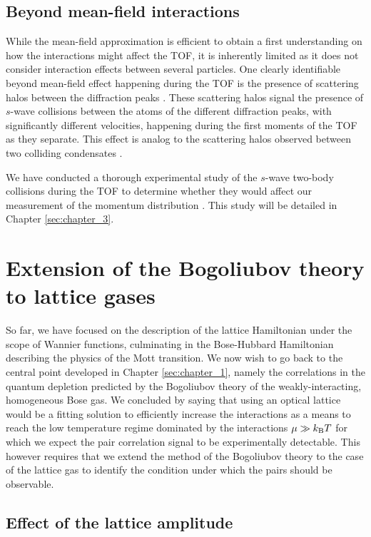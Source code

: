 \subsection{Beyond mean-field interactions}

While the mean-field approximation is efficient to obtain a first understanding on how the interactions might affect the TOF, it is inherently limited as it does not consider interaction effects between several particles. One clearly identifiable beyond mean-field effect happening during the TOF is the presence of scattering halos between the diffraction peaks \cite{greiner2001exploring}. These scattering halos signal the presence of $s$-wave collisions between the atoms of the different diffraction peaks, \ie with significantly different velocities, happening during the first moments of the TOF as they separate. This effect is analog to the scattering halos observed between two colliding condensates \cite{khakimov2016ghost,perrin2007observation,zin2006elastic}.

We have conducted a thorough experimental study of the $s$-wave two-body collisions during the TOF to determine whether they would affect our measurement of the momentum distribution \cite{tenart2020two}. This study will be detailed in Chapter \ref{sec:chapter_3}.

\section{Extension of the Bogoliubov theory to lattice gases}

So far, we have focused on the description of the lattice Hamiltonian under the scope of Wannier functions, culminating in the Bose-Hubbard Hamiltonian describing the physics of the Mott transition. We now wish to go back to the central point developed in Chapter \ref{sec:chapter_1}, namely the \kmk correlations in the quantum depletion predicted by the Bogoliubov theory of the weakly-interacting, homogeneous Bose gas. We concluded by saying that using an optical lattice would be a fitting solution to efficiently increase the interactions as a means to reach the low temperature regime dominated by the interactions $\mu \gg k_{\mathrm{B}} T$ for which we expect the pair correlation signal to be experimentally detectable. This however requires that we extend the method of the Bogoliubov theory to the case of the lattice gas to identify the condition under which the \kmk pairs should be observable.

\subsection{Effect of the lattice amplitude}

